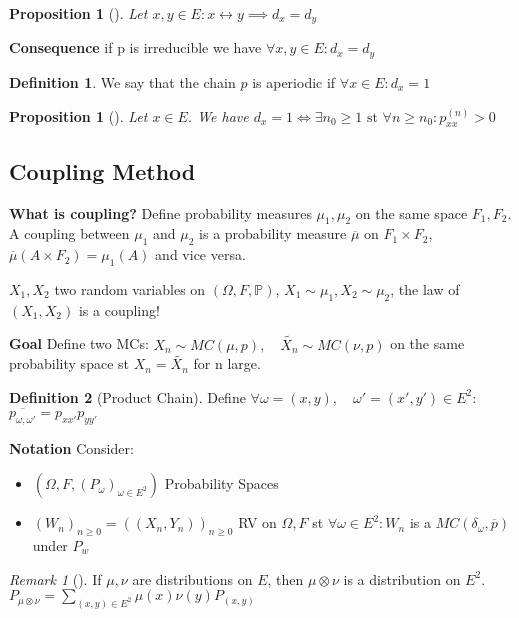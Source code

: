 \documentclass[12pt]{book}
\renewcommand{\iff}{\Leftrightarrow}
\newtheorem{prop}[theorem]{Proposition}
\theoremstyle{definition}
\newtheorem{defn}{Definition}[section]
\theoremstyle{remark}
\newtheorem{rmk}[theorem]{Remark}
\begin{document}
\begin{prop}[]
	Let $x,y \in E: x \leftrightarrow y \implies d_x=d_y$
\end{prop}

\textbf{Consequence} if p is irreducible we have $\forall x,y \in E: d_x = d_y$ 

\begin{defn}
	We say that the chain $p$ is aperiodic if $\forall x \in E: d_x=1$
\end{defn}

\begin{prop}[]
	Let $x \in E$. We have $d_x=1 \iff \exists n_0 \geq 1 \textrm{ st } \forall n \geq n_0: p_{xx}^{(n)}>0$
\end{prop}

\subsection{Coupling Method}
\textbf{What is coupling?}
Define probability measures $\mu_1, \mu_2$ on the same space $F_1,F_2$. A coupling between $\mu_1$ and $\mu_2$ is a probability measure $\overline{\mu }$ on $F_1 \times F_2$, 
$\overline{\mu }(A \times F_2)=\mu_1(A)$ and vice versa. 

$X_1, X_2$ two random variables on $(\Omega, F, \mathbb{P}) $, $X_1 \sim \mu_1, X_2 \sim \mu_2$, the law of $(X_1,X_2)$ is a coupling!

\noindent
\textbf{Goal} Define two MCs: $X_n \sim MC(\mu, p), \quad \tilde{X_n} \sim MC(\nu, p) $ on the same probability space st $X_n = \tilde{X_n}$ for n large.

\begin{defn}[Product Chain]
	Define $\forall \omega=(x,y), \quad \omega'=(x',y') \in E^2$: $\overline{p_{\omega, \omega'}}=p_{xx'}p_{yy'}$
\end{defn}

\noindent
\textbf{Notation} Consider:
\begin{itemize}
	\item $(\Omega, F, (P_\omega)_{\omega \in E^2})$ Probability Spaces
	\item $(W_n)_{n\geq 0}=((X_n,Y_n))_{n\geq 0}$ RV on $\Omega, F$ st $\forall \omega \in E^2: W_n$ is a $MC(\delta_\omega, \overline{p})$ under $P_w$
\end{itemize}

\begin{rmk}[]
	If $\mu, \nu $ are distributions on $E$, then $\mu \otimes \nu $ is a distribution on $E^2$. $P_{\mu \otimes \nu }= \sum_{(x,y)\in E^2}^{}\mu (x) \nu (y) P_{(x,y)} $
\end{rmk}
\end{document}
